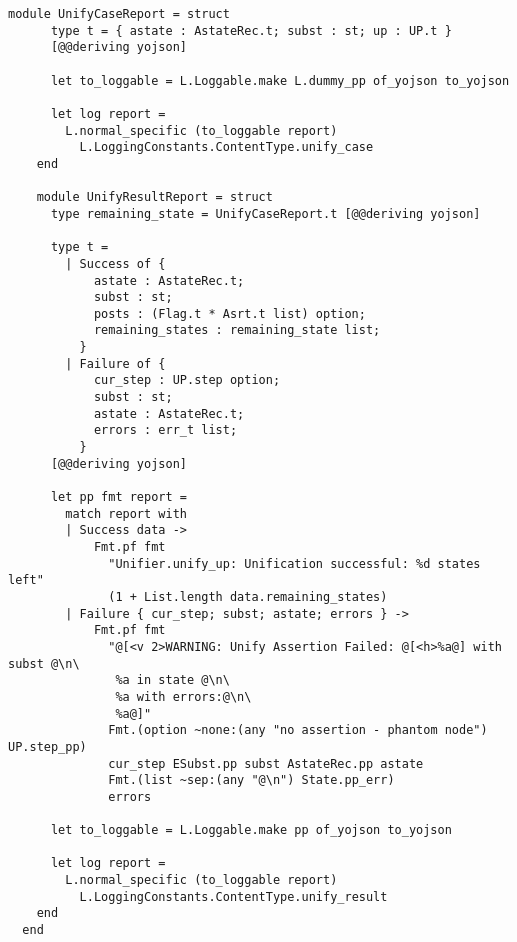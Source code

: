 \begin{lstlisting}[caption={
  Logging types for unification, inside the \texttt{Unifier} module
  \label{lst:unifier-logging}}, style=code]
    module UnifyCaseReport = struct
      type t = { astate : AstateRec.t; subst : st; up : UP.t }
      [@@deriving yojson]

      let to_loggable = L.Loggable.make L.dummy_pp of_yojson to_yojson

      let log report =
        L.normal_specific (to_loggable report)
          L.LoggingConstants.ContentType.unify_case
    end

    module UnifyResultReport = struct
      type remaining_state = UnifyCaseReport.t [@@deriving yojson]

      type t =
        | Success of {
            astate : AstateRec.t;
            subst : st;
            posts : (Flag.t * Asrt.t list) option;
            remaining_states : remaining_state list;
          }
        | Failure of {
            cur_step : UP.step option;
            subst : st;
            astate : AstateRec.t;
            errors : err_t list;
          }
      [@@deriving yojson]

      let pp fmt report =
        match report with
        | Success data ->
            Fmt.pf fmt
              "Unifier.unify_up: Unification successful: %d states left"
              (1 + List.length data.remaining_states)
        | Failure { cur_step; subst; astate; errors } ->
            Fmt.pf fmt
              "@[<v 2>WARNING: Unify Assertion Failed: @[<h>%a@] with subst @\n\
               %a in state @\n\
               %a with errors:@\n\
               %a@]"
              Fmt.(option ~none:(any "no assertion - phantom node") UP.step_pp)
              cur_step ESubst.pp subst AstateRec.pp astate
              Fmt.(list ~sep:(any "@\n") State.pp_err)
              errors

      let to_loggable = L.Loggable.make pp of_yojson to_yojson

      let log report =
        L.normal_specific (to_loggable report)
          L.LoggingConstants.ContentType.unify_result
    end
  end
\end{lstlisting}
